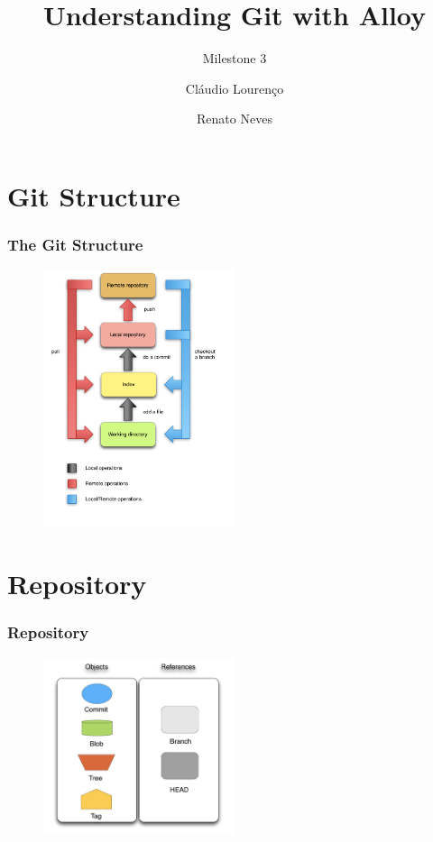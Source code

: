\documentclass{beamer}
\title{Understanding Git with Alloy}
\subtitle{Milestone 3}
\author{Cláudio Lourenço \and Renato Neves}
\institute{University of Minho\\
Formal Methods in Software Engineering}
\begin{document}
\frame {
   \titlepage
}


\section{Git Structure}
\begin{frame}
   \frametitle{The Git Structure}
   \begin{figure}
      \centering
      \includegraphics[width=0.5\textwidth]{images/git_workflow.png}
   \end{figure}
\end{frame}

\section{Repository}
\begin{frame}
   \frametitle{Repository}
   \begin{figure}
      \centering
      \includegraphics[width=0.5\textwidth]{images/legenda2.png}
   \end{figure}
\end{frame}
\end{document}
